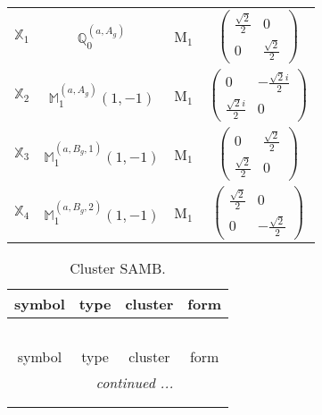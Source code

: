 \documentclass[fleqn,10pt,landscape]{article}
\begin{document}
\begin{itemize}
\begin{center}
\begin{longtable}{c|c|c|c}
$ \mathbb{X}_{1} $ & $\mathbb{Q}_{0}^{(a,A_{g})}$ & M$_{1}$ & $\begin{pmatrix} \frac{\sqrt{2}}{2} & 0 \\ 0 & \frac{\sqrt{2}}{2} \end{pmatrix}$ \\
$ \mathbb{X}_{2} $ & $\mathbb{M}_{1}^{(a,A_{g})}(1,-1)$ & M$_{1}$ & $\begin{pmatrix} 0 & - \frac{\sqrt{2} i}{2} \\ \frac{\sqrt{2} i}{2} & 0 \end{pmatrix}$ \\
$ \mathbb{X}_{3} $ & $\mathbb{M}_{1}^{(a,B_{g},1)}(1,-1)$ & M$_{1}$ & $\begin{pmatrix} 0 & \frac{\sqrt{2}}{2} \\ \frac{\sqrt{2}}{2} & 0 \end{pmatrix}$ \\
$ \mathbb{X}_{4} $ & $\mathbb{M}_{1}^{(a,B_{g},2)}(1,-1)$ & M$_{1}$ & $\begin{pmatrix} \frac{\sqrt{2}}{2} & 0 \\ 0 & - \frac{\sqrt{2}}{2} \end{pmatrix}$ \\
\end{longtable}
\end{center}
\begin{center}
\renewcommand{\arraystretch}{1.3}
\begin{longtable}{c|c|c|c}
\caption{Cluster SAMB.}
 \\
 \hline \hline
symbol & type & cluster & form \\ \hline \endfirsthead

\multicolumn{3}{l}{\tablename\ \thetable{}} \\
 \hline \hline
symbol & type & cluster & form \\ \hline \endhead

 \hline \hline
\multicolumn{3}{r}{\footnotesize\it continued ...} \\ \endfoot

 \hline \hline
\multicolumn{3}{r}{} \\ \endlastfoot


\end{longtable}
\end{center}
\end{itemize}
\end{document}
